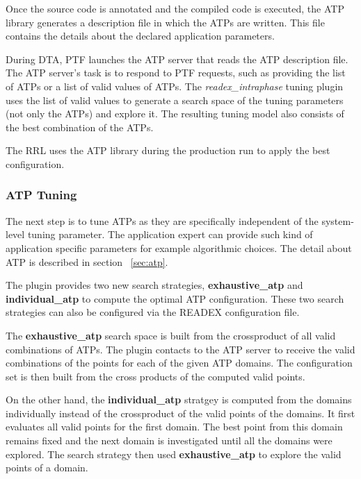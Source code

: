 Once the source code is annotated and the compiled code is executed, the ATP library generates a description file in which the ATPs are written. This file contains the details about the declared application parameters.

During DTA, PTF launches the ATP server that reads the ATP description file. The ATP server's task is to respond to PTF requests, such as providing the list of ATPs or a list of valid values of ATPs. The \textit{readex\_intraphase} tuning plugin uses the list of valid values to generate a search space of the tuning parameters (not only the ATPs) and explore it. The resulting tuning model also consists of the best combination of the ATPs.

The RRL uses the ATP library during the production run to apply the best configuration. 

\subsubsection{ATP Tuning} \label{atp-tuning} 
The next step is to tune ATPs as they are specifically independent of the system-level tuning parameter. The application expert can provide such kind of application specific parameters for example algorithmic choices. The detail about ATP is described in section ~\ref{sec:atp}. 

The plugin provides two new search strategies, \textbf{exhaustive\_atp} and \textbf{individual\_atp} to compute the optimal ATP configuration. These two search strategies can also be configured via the READEX configuration file.

The \textbf{exhaustive\_atp} search space is built from the crossproduct of all valid combinations of ATPs. The plugin contacts to the ATP server to receive the valid combinations of the points for each of the given ATP domains. The configuration set   is then built from the cross products of the computed valid points. 

On the other hand, the \textbf{individual\_atp} stratgey is computed from the domains individually instead of the crossproduct of the valid points of the domains. It first evaluates all valid points for the first domain. The best point from this domain remains fixed and the next domain is investigated until all the domains were explored. The search strategy then used \textbf{exhaustive\_atp} to explore the valid points of a domain. 






